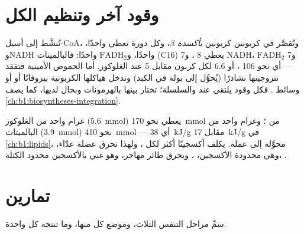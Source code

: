 \section{وقود آخر وتنظيم الكل}

\begin{proposition}\label{prop:b1:respiration-fermentation:otherfuels}
تُنشَّط  إلى أسيل-CoA، وتُقصَّر في  كربونين
كربونين \emph{بأكسدة $\beta$}، وكل دورة تعطي  واحدًا،
وNADH واحدًا، و$\mathrm{FADH_2}$ واحدًا: فالبالميتات (C16) يعطي 8
، و7 NADH، و7 $\mathrm{FADH_2}$ --- أي نحو 106 ، أو
\qty{6.6}{}  لكل كربون مقابل 5 عند الغلوكوز. أما الحموض الأمينية
فتفقد نتروجينها نشادرًا (يُحوَّل إلى بولة في الكبد) وتدخل هياكلها
الكربونية بيروفاتًا أو  أو وسائط . فكل وقود
يلتقي عند  والسلسلة؛  تختار بينها بالهرمونات وبحال
 لديها، كما يصف \cref{ch:b1:biosyntheses-integration}.
\end{proposition}

\begin{example}[غرام من كل]\label{ex:b1:respiration-fermentation:gramofeach}
غرام واحد من الغلوكوز (\qty{5.6}{mmol}) يعطي نحو \qty{170}{mmol} من
؛ وغرام واحد من البالميتات (\qty{3.9}{mmol}) نحو \qty{410}{mmol}
--- أي \qty{38}{kJ/g} مقابل \qty{17}{kJ/g} في \cref{ch:b1:lipids}،
محوَّلة إلى عملة.  يكلف أكسجينًا أكثر لكل ، ولهذا تحرق عضلة
عدّاء، وهي محدودة الأكسجين، ، ويحرق طائر مهاجر، وهو غني
بالأكسجين محدود الكتلة، .
\end{example}

\section{تمارين}

\begin{exercise}[$\star$]\label{exo:b1:respiration-fermentation:1}
سمِّ مراحل التنفس الثلاث، وموضع كل منها، وما تنتجه كل واحدة.
\end{exercise}

